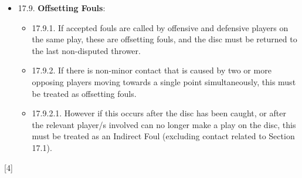 \begin{itemize}[noitemsep]
    \item 17.9. \textbf{Offsetting Fouls}:
        \begin{itemize}
            \item 17.9.1. If accepted fouls are called by offensive and defensive players on the same play, these are offsetting fouls, and the disc must be returned to the last non-disputed thrower.
            \item 17.9.2. If there is non-minor contact that is caused by two or more opposing players moving towards a single point simultaneously, this must be treated as offsetting fouls.
            \item 17.9.2.1. However if this occurs after the disc has been caught, or after the relevant player/s involved can no longer make a play on the disc, this must be treated as an Indirect Foul (excluding contact related to Section 17.1).
        \end{itemize}
\end{itemize}
\begin{center}[4]\end{center}
